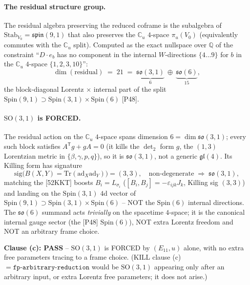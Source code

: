 \paragraph{The residual structure group.} The residual algebra preserving the reduced
coframe is the subalgebra of $\mathrm{Stab}_{V_0}=\mathfrak{spin}(9,1)$ that also
preserves the $\mathbb{C}_u$ $4$-space $\pi_u(V_0)$ (equivalently commutes with the
$\mathbb{C}_u$ split). Computed as the exact nullspace over $\mathbb{Q}$ of the
constraint ``$D\cdot e_b$ has no component in the internal $W$-directions $\{4\ldots9\}$
for $b$ in the $\mathbb{C}_u$ $4$-space $\{1,2,3,10\}$'':
\begin{equation}
  \dim(\text{residual}) \;=\; 21 \;=\; \underbrace{\mathfrak{so}(3,1)}_{6}\ \oplus\
  \underbrace{\mathfrak{so}(6)}_{15},
\end{equation}
the block-diagonal Lorentz $\times$ internal part of the split
$\mathrm{Spin}(9,1)\supset\mathrm{Spin}(3,1)\times\mathrm{Spin}(6)$ [P48].

\paragraph{$\mathrm{SO}(3,1)$ is FORCED.} The residual action on the $\mathbb{C}_u$
$4$-space spans dimension $6=\dim\mathfrak{so}(3,1)$; every such block satisfies
$A^{\mathsf T}g+gA=0$ (it kills the $\det_2$ form $g$, the $(1,3)$ Lorentzian metric in
$\{\beta,\gamma,p,q\}$), so it is $\mathfrak{so}(3,1)$, not a generic $\mathfrak{gl}(4)$.
Its Killing form has signature
\begin{equation}
  \mathrm{sig}\big(B(X,Y)=\mathrm{Tr}(\mathrm{ad}_X\mathrm{ad}_Y)\big) = (3,3),
  \quad\text{non-degenerate} \;\Longrightarrow\; \mathfrak{so}(3,1),
\end{equation}
matching the [52KKT] boosts $B_i=L_{\sigma_i}$ ($[B_i,B_j]=-\varepsilon_{ijk}J_k$,
Killing sig $(3,3)$) and landing on the $\mathrm{Spin}(3,1)$ $4$d vector of
$\mathrm{Spin}(9,1)\supset\mathrm{Spin}(3,1)\times\mathrm{Spin}(6)$ -- NOT the
$\mathrm{Spin}(6)$ internal directions. The $\mathfrak{so}(6)$ summand acts
\emph{trivially} on the spacetime $4$-space; it is the canonical internal gauge sector
(the [P48] $\mathrm{Spin}(6)$), NOT extra Lorentz freedom and NOT an arbitrary frame
choice.

\textbf{Clause (c): PASS} -- $\mathrm{SO}(3,1)$ is FORCED by $(E_{11},u)$ alone, with
no extra free parameters tracing to a frame choice. (KILL clause (c) $=
\mathtt{fp\text{-}arbitrary\text{-}reduction}$ would be $\mathrm{SO}(3,1)$ appearing
only after an arbitrary input, or extra Lorentz free parameters; it does not arise.)

